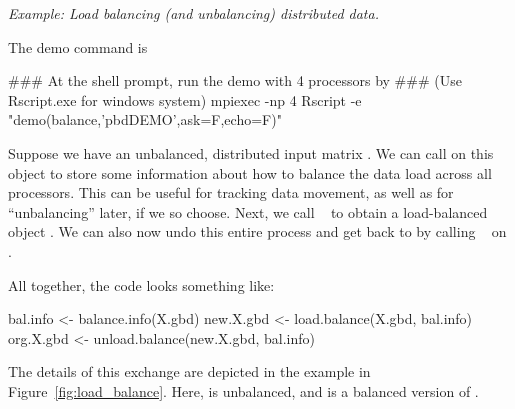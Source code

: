 \emph{Example:  Load balancing (and unbalancing) distributed data.}

The demo command is
\begin{Command}
### At the shell prompt, run the demo with 4 processors by
### (Use Rscript.exe for windows system)
mpiexec -np 4 Rscript -e "demo(balance,'pbdDEMO',ask=F,echo=F)"
\end{Command}

Suppose we have an unbalanced, distributed input matrix .  We can 
call  on this object to store some information about how to 
balance the data load across all processors.  This can be useful for tracking 
data movement, as well as for ``unbalancing'' later, if we so choose.  Next, we 
call
~
to obtain a load-balanced object .  We can also now undo this entire process and get back to  by calling
~ on .


All together, the code looks something like:
\begin{Code}[title=R Code]
bal.info <- balance.info(X.gbd)
new.X.gbd <- load.balance(X.gbd, bal.info)
org.X.gbd <- unload.balance(new.X.gbd, bal.info)
\end{Code}

The details of this exchange are depicted in the example in Figure~\ref{fig:load_balance}.  Here, 
 is unbalanced, and  is a balanced version of .

